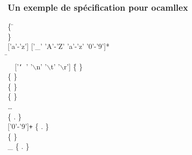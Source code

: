 %
\begin{frame}
\frametitle{Un exemple de spécification pour ocamllex}

\label{exemple_ocamllex}

{\small
\begin{tabbing}
\{ \= \Xopen {}\\
   \> \Xexception {} \Xof {} \}\\
\Xlet {} \equal \textsf{['a'-'z'] ['\_' 'A'-'Z' 'a'-'z' '0'-'9']*}\\
\Xrule \=  \equal \Xparse\\
  \> \ \ \textsf{['{\tt\char`\ }' '\(\backslash\)n' '\(\backslash\)t'
   '\(\backslash\)r']} \= \{   \}\\
  \> \vbar{}  \> \{ \Tlet \}\\
  \> \vbar{}  \> \{ \Trec \}\\
  \> \vbar{} \str{=}   \> \{ \Tequal \}\\
  \> \ldots \\
  \> \vbar{}  \> \{ \Tident
   \lpar{}. \rpar \}\\
  \> \vbar{} \textsf{['0'-'9']\texttt{+}} \> \{ \Tint
   \lpar{} \lpar{}.
   \rpar\rpar{} \}\\
  \> \vbar{}  \> \{ \Teof \}\\
  \> \vbar{} {\LARGE \_} \> \{  \lpar{}
   \lpar{}. \rpar\rpar{} \}
\end{tabbing}
}
\end{frame}


